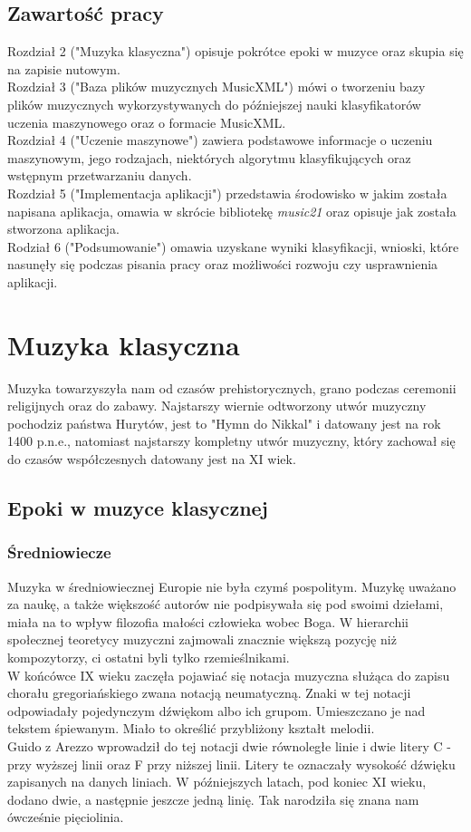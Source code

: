\documentclass[printmode, eng, openany]{mgr}
\newcommand\tab[1][1cm]{\hspace*{#1}}
\begin{document}
\section{Zawartość pracy}
\tab Rozdział 2 ("Muzyka klasyczna") opisuje pokrótce epoki w muzyce oraz skupia się na zapisie nutowym.\\
\tab Rozdział 3 ("Baza plików muzycznych MusicXML") mówi o tworzeniu bazy plików muzycznych wykorzystywanych do późniejszej nauki klasyfikatorów uczenia maszynowego oraz o formacie MusicXML.\\ 
\tab Rozdział 4 ("Uczenie maszynowe") zawiera podstawowe informacje o uczeniu maszynowym, jego rodzajach, niektórych algorytmu klasyfikujących oraz wstępnym przetwarzaniu danych.\\ 
\tab Rozdział 5 ("Implementacja aplikacji") przedstawia środowisko w jakim została napisana aplikacja, omawia w skrócie bibliotekę \textit{music21} oraz opisuje jak została stworzona aplikacja.\\ 
\tab Rodział 6 ("Podsumowanie") omawia uzyskane wyniki klasyfikacji, wnioski, które nasunęły się podczas pisania pracy oraz możliwości rozwoju czy usprawnienia aplikacji. \\ 
\chapter{Muzyka klasyczna}
\tab Muzyka towarzyszyła nam od czasów prehistorycznych, grano podczas ceremonii religijnych oraz do zabawy. Najstarszy wiernie odtworzony utwór muzyczny pochodzi\linebreak z państwa Hurytów, jest to "Hymn do Nikkal" i datowany jest na rok 1400 p.n.e., natomiast najstarszy kompletny utwór muzyczny, który zachował się do czasów współczesnych datowany jest na XI wiek. \cite{oldest}
\section{Epoki w muzyce klasycznej}
\subsection{Średniowiecze}
\tab Muzyka w średniowiecznej Europie nie była czymś pospolitym. Muzykę uważano za naukę, a także większość autorów nie podpisywała się pod swoimi dziełami, miała na to wpływ filozofia małości człowieka wobec Boga. W hierarchii społecznej teoretycy muzyczni zajmowali znacznie większą pozycję niż kompozytorzy, ci ostatni byli tylko rzemieślnikami. \cite{sred} \\
\tab W końcówce IX wieku zaczęła pojawiać się notacja muzyczna służąca do zapisu chorału gregoriańskiego zwana notacją neumatyczną. Znaki w tej notacji odpowiadały pojedynczym dźwiękom albo ich grupom. Umieszczano je nad tekstem śpiewanym. Miało to określić przybliżony kształt melodii. \\
\tab Guido z Arezzo wprowadził do tej notacji dwie równoległe linie i dwie litery C - przy wyższej linii oraz F przy niższej linii. Litery te oznaczały wysokość dźwięku zapisanych na danych liniach. W późniejszych latach, pod koniec XI wieku, dodano dwie, a następnie jeszcze jedną linię. Tak narodziła się znana nam ówcześnie pięciolinia. \cite{neum}
\end{document}
